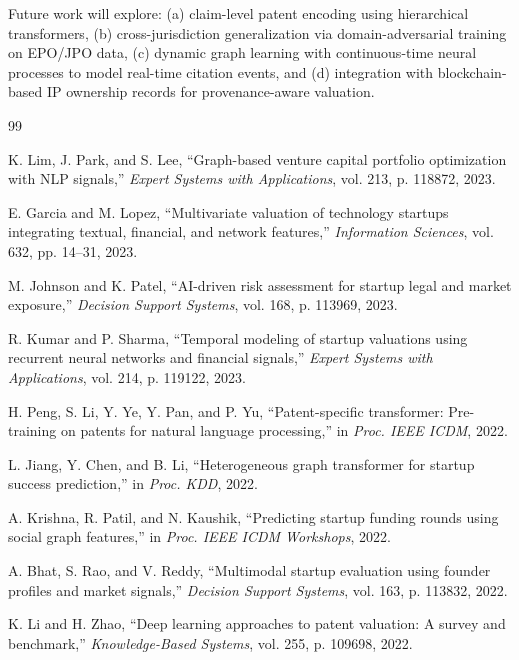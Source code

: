 \documentclass[journal]{IEEEtran}
\begin{document}
Future work will explore: (a) claim-level patent encoding using hierarchical transformers, (b) cross-jurisdiction generalization via domain-adversarial training on EPO/JPO data, (c) dynamic graph learning with continuous-time neural processes to model real-time citation events, and (d) integration with blockchain-based IP ownership records for provenance-aware valuation.

\begin{thebibliography}{99}

K. Lim, J. Park, and S. Lee, ``Graph-based venture capital portfolio optimization with NLP signals,'' \textit{Expert Systems with Applications}, vol. 213, p. 118872, 2023.

E. Garcia and M. Lopez, ``Multivariate valuation of technology startups integrating textual, financial, and network features,'' \textit{Information Sciences}, vol. 632, pp. 14--31, 2023.

M. Johnson and K. Patel, ``AI-driven risk assessment for startup legal and market exposure,'' \textit{Decision Support Systems}, vol. 168, p. 113969, 2023.

R. Kumar and P. Sharma, ``Temporal modeling of startup valuations using recurrent neural networks and financial signals,'' \textit{Expert Systems with Applications}, vol. 214, p. 119122, 2023.

H. Peng, S. Li, Y. Ye, Y. Pan, and P. Yu, ``Patent-specific transformer: Pre-training on patents for natural language processing,'' in \textit{Proc. IEEE ICDM}, 2022.

L. Jiang, Y. Chen, and B. Li, ``Heterogeneous graph transformer for startup success prediction,'' in \textit{Proc. KDD}, 2022.

A. Krishna, R. Patil, and N. Kaushik, ``Predicting startup funding rounds using social graph features,'' in \textit{Proc. IEEE ICDM Workshops}, 2022.

A. Bhat, S. Rao, and V. Reddy, ``Multimodal startup evaluation using founder profiles and market signals,'' \textit{Decision Support Systems}, vol. 163, p. 113832, 2022.

K. Li and H. Zhao, ``Deep learning approaches to patent valuation: A survey and benchmark,'' \textit{Knowledge-Based Systems}, vol. 255, p. 109698, 2022.


\end{thebibliography}
\end{document}
